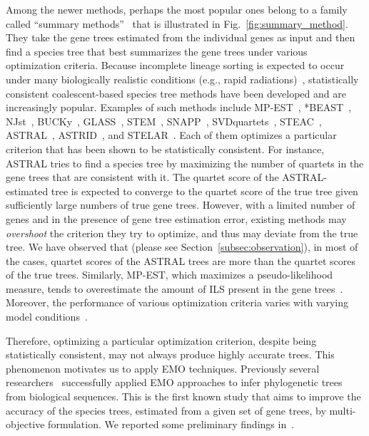 Among the newer methods, perhaps the most popular ones belong to a family called ``summary methods''~\cite{bayzid2013naive} that is illustrated in Fig.~\ref{fig:summary_method}. They take the gene trees estimated from the individual genes as input and then find a species tree that best summarizes the gene trees under various optimization criteria. 
Because incomplete lineage sorting is
expected to occur under many biologically realistic conditions (e.g., rapid radiations)~\cite{jarvis2014whole}, statistically consistent coalescent-based species tree methods have been developed and are increasingly popular. 
Examples of such methods include
MP-EST~\cite{mpest}, *BEAST~\cite{heled-drummond}, NJst~\cite{njst}, BUCKy~\cite{larget-bioinf2010}, GLASS~\cite{glass}, STEM~\cite{stem}, SNAPP~\cite{snapp}, SVDquartets~\cite{svdquartet}, STEAC~\cite{steac},
ASTRAL~\cite{mirarab2014astral}, ASTRID~\cite{vachaspati2015astrid}, and STELAR~\cite{islam2019stelar}. Each of them optimizes a particular criterion that has been shown to be statistically consistent. For instance, ASTRAL tries to find a species tree by maximizing the number of quartets in the gene trees that are consistent with it. The quartet score of the ASTRAL-estimated tree is expected to converge to the quartet score of the true tree given sufficiently large numbers of true gene trees. However, with a limited number of genes and in the presence of gene tree estimation error, existing methods may \textit{overshoot} the criterion they try to optimize, and thus may deviate from the true tree. We have observed that (please see Section~\ref{subsec:observation}), in most of the cases, quartet scores of the ASTRAL trees are more than the quartet scores of the true trees. Similarly, MP-EST, which maximizes a pseudo-likelihood measure, tends to overestimate the amount of ILS present in the gene trees~\cite{statistical-binning,bayzid2015weighted}. Moreover, the performance of various optimization criteria varies with varying model conditions~\cite{mirarab2014evaluating,chou2015comparative}.


Therefore, optimizing a particular optimization criterion, despite being statistically consistent, may not always produce highly accurate trees. This phenomenon motivates us to apply EMO techniques. 
Previously several researchers~\cite{villalobos2018memetic, santander2016performance, zambrano2016mo} successfully applied EMO approaches to infer phylogenetic trees from biological sequences. This is the first known study that aims to improve the accuracy of the species trees, estimated from a given set of gene trees, by multi-objective formulation. We reported some preliminary findings in~\cite{nayeem2020multi}.



